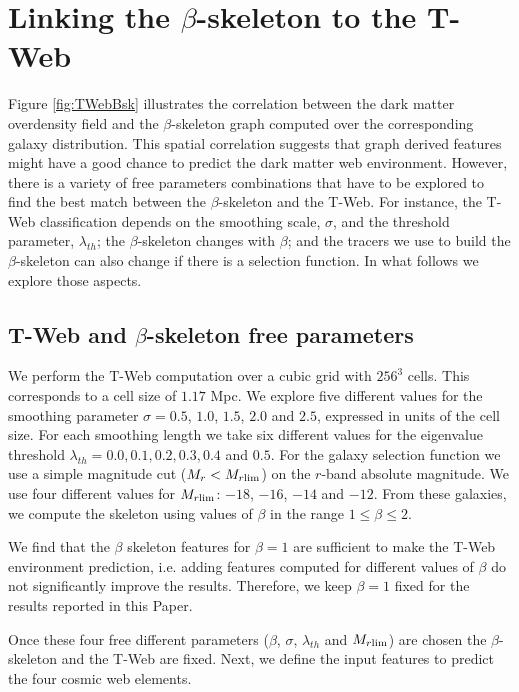 \documentclass[usenatbib]{mnras}
\begin{document}
\section{Linking the $\beta$-skeleton to the T-Web}\label{sec:link}

Figure \ref{fig:TWebBsk} illustrates the correlation between the dark matter overdensity field and the $\beta$-skeleton graph computed over the corresponding galaxy distribution. 
This spatial correlation suggests that graph derived features might have
a good chance to predict the dark matter web environment. 
However, there is a variety of free parameters combinations that have to be explored to find the best match between the $\beta$-skeleton and the T-Web.
For instance, the T-Web classification depends on the smoothing scale, $\sigma$, and the threshold parameter, $\lambda_{th}$; the $\beta$-skeleton changes with $\beta$; and the tracers we use to build the $\beta$-skeleton can also change if there is a  selection function.
In what follows we explore those aspects.


\subsection{T-Web and $\beta$-skeleton free parameters}

We perform the T-Web computation over a cubic grid with $256^3$ cells. 
This corresponds to a cell size of $1.17$ Mpc.
We explore five different values for the smoothing parameter $\sigma =
0.5$, $1.0$, $1.5$, $2.0$ and $2.5$, expressed in units of the cell size.
For each smoothing length we take six different values for
the eigenvalue threshold
$\lambda_{th}=0.0, 0.1, 0.2, 0.3, 0.4$ and $0.5$. 
For the galaxy selection function we use a simple magnitude cut ($M_{r}<M_{r\rm{lim}}$) on the $r$-band absolute magnitude.
We use four different values for $M_{r\rm{lim}}$: $-18$, $-16$, $-14$ and $-12$.
From these galaxies, we compute the skeleton using values of $\beta$ in
the range $1\leq \beta \leq 2$.

We find that the $\beta$ skeleton features for $\beta=1$ are sufficient to make the T-Web environment prediction, i.e. adding features computed for different values of $\beta$ do not significantly improve the results.
Therefore, we keep $\beta=1$ fixed for the results reported in this Paper.

Once these four free different parameters ($\beta$,
$\sigma$, $\lambda_{th}$ and $M_{r\rm{lim}}$) are chosen the $\beta$-skeleton and the T-Web are fixed.  
Next, we define the input features to predict the four cosmic web elements.
\end{document}
